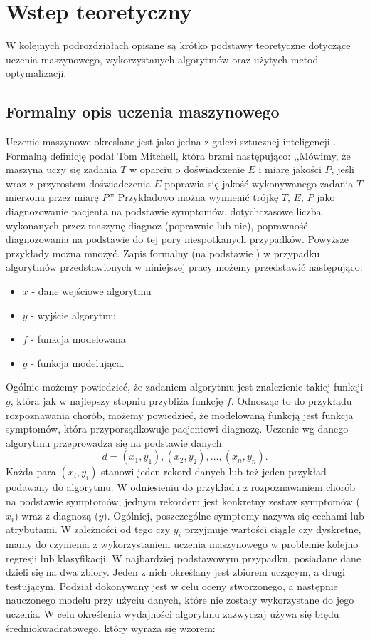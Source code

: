 \section{Wstep teoretyczny} \label{theory}
W kolejnych podrozdziałach opisane są krótko podstawy teoretyczne dotyczące uczenia maszynowego, wykorzystanych algorytmów oraz użytych metod optymalizacji.
\subsection{Formalny opis uczenia maszynowego}
Uczenie maszynowe okreslane jest jako jedna z galezi sztucznej inteligencji \cite{dnn1}. Formalną definicję podał Tom Mitchell, która brzmi następująco: ,,Mówimy, że maszyna uczy się zadania $T$ w oparciu o doświadczenie $E$ i miarę jakości $P$, jeśli wraz z przyrostem doświadczenia $E$ poprawia się jakość wykonywanego zadania $T$ mierzona przez miarę $P$.''\cite{mitchel} Przykładowo można wymienić trójkę $T$, $E$, $P$ jako diagnozowanie pacjenta na podstawie symptomów, dotychczasowe  liczba wykonanych przez maszynę diagnoz (poprawnie lub nie),  poprawność diagnozowania na podstawie do tej pory niespotkanych przypadków. Powyższe przykłady można mnożyć. Zapis formalny (na podstawie \cite{formal2}) w przypadku algorytmów przedstawionych w niniejszej pracy możemy przedstawić następująco:
\begin{itemize}
\item $x$ - dane wejściowe algorytmu
\item $y$ - wyjście algorytmu
\item $f$ - funkcja modelowana
\item $g$ - funkcja modelująca.
\end{itemize}
Ogólnie możemy powiedzieć, że zadaniem algorytmu jest znalezienie takiej funkcji $g$, która jak w najlepszy stopniu przybliża funkcję $f$. Odnosząc to do przykładu rozpoznawania chorób, możemy powiedzieć, że modelowaną funkcją jest funkcja symptomów, która przyporządkowuje pacjentowi diagnozę. Uczenie wg danego algorytmu przeprowadza się na podstawie danych:
\begin{equation}
d = (x_1,y_1), (x_2, y_2), ..., (x_n, y_n).
\end{equation}
Każda para $(x_i, y_i)$ stanowi jeden rekord danych lub też jeden przykład podawany do algorytmu. W odniesieniu do przykładu z rozpoznawaniem chorób na podstawie symptomów, jednym rekordem jest konkretny zestaw symptomów ($x_i$) wraz z diagnozą ($y$).  Ogólniej, poszczególne symptomy nazywa się cechami lub atrybutami. W zależności od tego czy $y_i$ przyjmuje wartości ciągłe czy dyskretne, mamy do czynienia z wykorzystaniem uczenia maszynowego w problemie kolejno regresji lub klasyfikacji. W najbardziej podstawowym przypadku, posiadane dane dzieli się na dwa zbiory. Jeden z nich określany jest zbiorem uczącym, a drugi testującym. Podział dokonywany jest w celu oceny stworzonego, a następnie nauczonego modelu przy użyciu danych, które nie zostały wykorzystane do jego uczenia. W celu określenia wydajności algorytmu zazwyczaj używa się błędu średniokwadratowego, który wyraża się wzorem:
